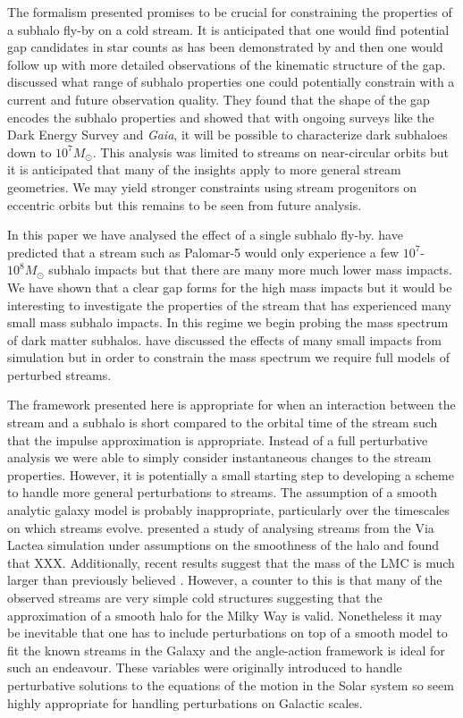 \documentclass[useAMS,usenatbib,fleqn,a4paper]{mn2e}
\begin{document}
The formalism presented promises to be crucial for constraining the properties of a subhalo fly-by on a cold stream. It is anticipated that one would find potential gap candidates in star counts as has been demonstrated by \cite{Carlberg2013} and then one would follow up with more detailed observations of the kinematic structure of the gap. \cite{ErkalBelokurov2015b} discussed what range of subhalo properties one could potentially constrain with a current and future observation quality. They found that the shape of the gap encodes the subhalo properties and showed that with ongoing surveys like the Dark Energy Survey and \textit{Gaia}, it will be possible to characterize dark subhaloes down to $10^7M_\odot$. This analysis was limited to streams on near-circular orbits but it is anticipated that many of the insights apply to more general stream geometries. We may yield stronger constraints using stream progenitors on eccentric orbits but this remains to be seen from future analysis.

In this paper we have analysed the effect of a single subhalo fly-by. \cite{YoonJohnstonHogg} have predicted that a stream such as Palomar-5 would only experience a few $10^7$-$10^8M_\odot$ subhalo impacts but that there are many more much lower mass impacts. We have shown that a clear gap forms for the high mass impacts but it would be interesting to investigate the properties of the stream that has experienced many small mass subhalo impacts. In this regime we begin probing the mass spectrum of dark matter subhalos. \cite{Carlberg2013} \cite{NganCarlberg2014} have discussed the effects of many small impacts from simulation but in order to constrain the mass spectrum we require full models of perturbed streams.

The framework presented here is appropriate for when an interaction between the stream and a subhalo is short compared to the orbital time of the stream such that the impulse approximation is appropriate. Instead of a full perturbative analysis we were able to simply consider instantaneous changes to the stream properties. However, it is potentially a small starting step to developing a scheme to handle more general perturbations to streams. The assumption of a smooth analytic galaxy model is probably inappropriate, particularly over the timescales on which streams evolve. \cite{Bonaca2014} presented a study of analysing streams from the Via Lactea simulation under assumptions on the smoothness of the halo and found that XXX. Additionally, recent results suggest that the mass of the LMC is much larger than previously believed \citep{Kallivayalil2013, Penarrubia2015}. However, a counter to this is that many of the observed streams are very simple cold structures suggesting that the approximation of a smooth halo for the Milky Way is valid. Nonetheless it may be inevitable that one has to include perturbations on top of a smooth model to fit the known streams in the Galaxy and the angle-action framework is ideal for such an endeavour. These variables were originally introduced to handle perturbative solutions to the equations of the motion in the Solar system so seem highly appropriate for handling perturbations on Galactic scales.
\end{document}
